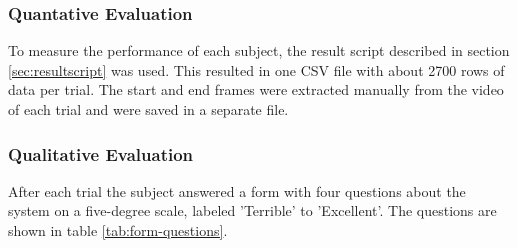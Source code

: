 \documentclass[nofilelist]{cslthse-msc}
\begin{document}
\subsubsection{Quantative Evaluation}
To measure the performance of each subject, the result script described in section \ref{sec:resultscript} was used. This resulted in one CSV file with about 2700 rows of data per trial. The start and end frames were extracted manually from the video of each trial and were saved in a separate file.  

\subsubsection{Qualitative Evaluation}
After each trial the subject answered a form with four questions about the system on a five-degree scale, labeled 'Terrible' to 'Excellent'. The questions are shown in table \ref{tab:form-questions}.

\setlength{\extrarowheight}{5pt}
\vspace{10pt}
\end{document}
